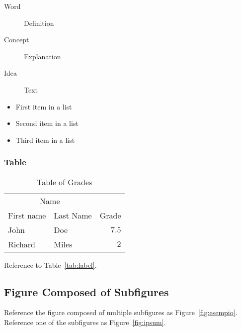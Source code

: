 \documentclass[
10pt, %
a4paper, %
oneside, %
headinclude,footinclude, %
BCOR5mm, %
]{scrartcl}
\begin{document}
\lipsum[12] %

\begin{description}
\item[Word] Definition
\item[Concept] Explanation
\item[Idea] Text
\end{description}

\lipsum[12] %

\begin{itemize}[noitemsep] %
\item First item in a list
\item Second item in a list
\item Third item in a list
\end{itemize}

\subsubsection{Table}

\lipsum[13] %

\begin{table}[hbt]
\caption{Table of Grades}
\centering
\begin{tabular}{llr}
\toprule
\multicolumn{2}{c}{Name} \\
\cmidrule(r){1-2}
First name & Last Name & Grade \\
\midrule
John & Doe & $7.5$ \\
Richard & Miles & $2$ \\
\bottomrule
\end{tabular}
\label{tab:label}
\end{table}

Reference to Table~\vref{tab:label}. %


\subsection{Figure Composed of Subfigures}

Reference the figure composed of multiple subfigures as Figure~\vref{fig:esempio}. Reference one of the subfigures as Figure~\vref{fig:ipsum}. %

\lipsum[15-18] %
\end{document}

